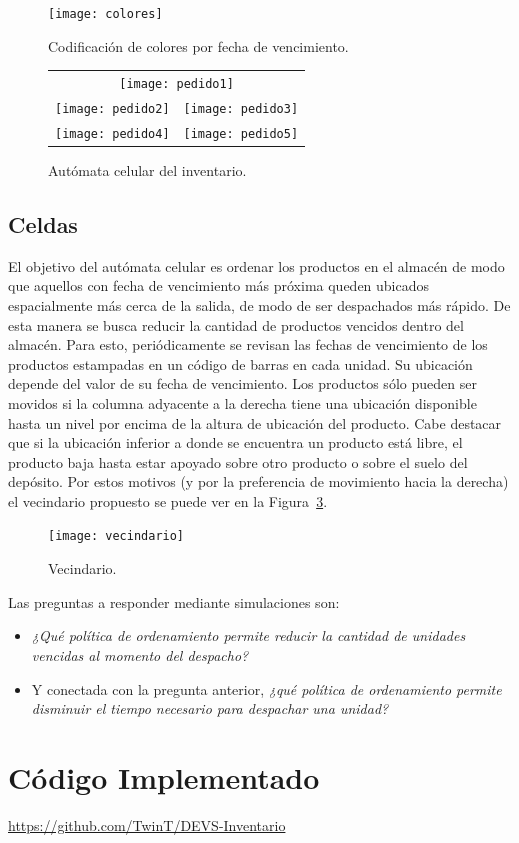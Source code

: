 \documentclass[10pt]{article}
\begin{document}
 \begin{figure}[h] 
 	\centering 
 	\texttt{[image: colores]} 
 	\caption{Codificación de colores por fecha de vencimiento.} 
 	\label{fig:AC-colores} 
 \end{figure}
 
 \begin{figure}[h] 
 \centering
 
 	\begin{tabular}{cc}
 		\multicolumn{2}{c}{\texttt{[image: pedido1]}}\\[5mm]
 		\texttt{[image: pedido2]} &
 		\texttt{[image: pedido3]} \\[5mm]
 		\texttt{[image: pedido4]} &
 		\texttt{[image: pedido5]} \\
 	\end{tabular}
 	
 	\caption{Autómata celular del inventario.} 
 	\label{fig:AC-inventario} 
 \end{figure}
 \FloatBarrier
 
\subsection{Celdas}

El objetivo del autómata celular es ordenar los productos en el almacén de modo que aquellos con fecha de vencimiento más próxima queden ubicados espacialmente más cerca de la salida, de modo de ser despachados más rápido. De esta manera se busca reducir la cantidad de productos vencidos dentro del almacén. Para esto, periódicamente se revisan las fechas de vencimiento de los productos estampadas en un código de barras en cada unidad. Su ubicación depende del valor de su fecha de vencimiento. Los productos sólo pueden ser movidos si la columna adyacente a la derecha tiene una ubicación disponible hasta un nivel por encima de la altura de ubicación del producto.
Cabe destacar que si la ubicación inferior a donde se encuentra un producto está libre, el producto baja hasta estar apoyado sobre otro producto o sobre el suelo del depósito.
Por estos motivos (y por la preferencia de movimiento hacia la derecha) el vecindario propuesto se puede ver en la Figura~\ref{fig:AC-vecindario}.

\begin{figure}[h] 
  \centering 
  \texttt{[image: vecindario]} 
  \caption{Vecindario.} 
  \label{fig:AC-vecindario} 
\end{figure}
\FloatBarrier

Las preguntas a responder mediante simulaciones son:
\begin{itemize}
\item \textit{¿Qué política de ordenamiento permite reducir la cantidad de unidades vencidas al momento del despacho?}
\item Y conectada con la pregunta anterior, \textit{¿qué política de ordenamiento permite disminuir el tiempo necesario para despachar una unidad?}
\end{itemize}


\appendix
\section{Código Implementado}

\url{https://github.com/TwinT/DEVS-Inventario}



\end{document}
